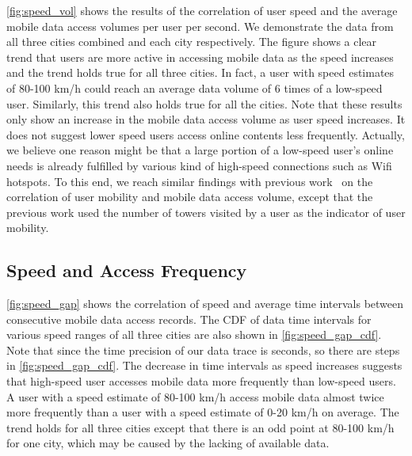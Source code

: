 \autoref{fig:speed_vol} shows the results of the correlation of user speed and the average mobile data access volumes per user per second. We demonstrate the data from all three cities combined and each city respectively. The figure shows a clear trend that users are more active in accessing mobile data as the speed increases and the trend holds true for all three cities. In fact, a user with speed estimates of 80-100 km/h could reach an average data volume of 6 times of a low-speed user. Similarly, this trend also holds true for all the cities. Note that these results only show an increase in the mobile data access volume as user speed increases. It does not suggest lower speed users access online contents less frequently. Actually, we believe one reason might be that a large portion of a low-speed user's online needs is already fulfilled by various kind of high-speed connections such as Wifi hotspots. To this end, we reach similar findings with previous work~\cite{yang2015characterizing} on the correlation of user mobility and mobile data access volume, except that the previous work used the number of towers visited by a user as the indicator of user mobility.

\subsection{Speed and Access Frequency}


\autoref{fig:speed_gap} shows the correlation of speed and average time intervals between consecutive mobile data access records. The CDF of data time intervals for various speed ranges of all three cities are also shown in \autoref{fig:speed_gap_cdf}. Note that since the time precision of our data trace is seconds, so there are steps in \autoref{fig:speed_gap_cdf}. The decrease in time intervals as speed increases suggests that high-speed user accesses mobile data more frequently than low-speed users. A user with a speed estimate of 80-100 km/h access mobile data almost twice more frequently than a user with a speed estimate of 0-20 km/h on average. The trend holds for all three cities except that there is an odd point at 80-100 km/h for one city, which may be caused by the lacking of available data.

